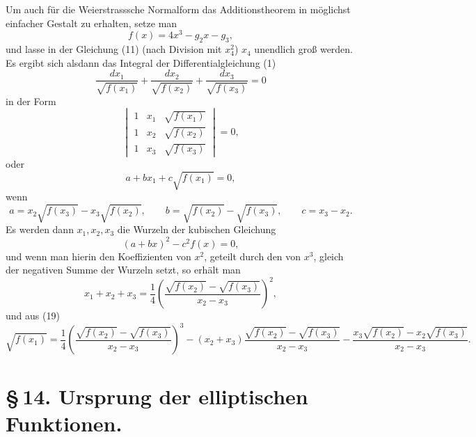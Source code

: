 \documentclass[11pt]{article}
\begin{document}
Um auch für die Weierstrasssche Normalform das Additionstheorem in möglichst einfacher Gestalt zu erhalten, setze man
\[
f(x)=4x^3-g_2x-g_3,
\]
und lasse in der Gleichung (11) (nach Division mit $x_4^2$) $x_4$ unendlich groß werden. Es ergibt sich alsdann das Integral der Differentialgleichung (1)
\[
\frac{dx_1}{\sqrt{f(x_1)}}+
\frac{dx_2}{\sqrt{f(x_2)}}+
\frac{dx_3}{\sqrt{f(x_3)}}=0
\]
in der Form
\begin{equation}
\begin{vmatrix}
1&x_1&\sqrt{f(x_1)}\\
1&x_2&\sqrt{f(x_2)}\\
1&x_3&\sqrt{f(x_3)}
\end{vmatrix}=0,
\tag{18}
\end{equation}
oder
\begin{equation}
a+bx_1+c\sqrt{f(x_1)}=0,
\tag{19}
\end{equation}
wenn
\begin{equation}
a=x_2\sqrt{f(x_3)}-x_3\sqrt{f(x_2)},\qquad
b=\sqrt{f(x_2)}-\sqrt{f(x_3)},\qquad
c=x_3-x_2.
\tag{20}
\end{equation}
Es werden dann $x_1,x_2,x_3$ die Wurzeln der kubischen Gleichung
\[
(a+bx)^2-c^2f(x)=0,
\]
und wenn man hierin den Koeffizienten von $x^2$, geteilt durch den von $x^3$, gleich der negativen Summe der Wurzeln setzt, so erhält man
\begin{equation}
x_1+x_2+x_3=\frac14\left(\frac{\sqrt{f(x_2)}-\sqrt{f(x_3)}}{x_2-x_3}\right)^2,
\tag{21}
\end{equation}
und aus (19)
\begin{equation}
\sqrt{f(x_1)}
=
\frac14\left(\frac{\sqrt{f(x_2)}-\sqrt{f(x_3)}}{x_2-x_3}\right)^3
-(x_2+x_3)\frac{\sqrt{f(x_2)}-\sqrt{f(x_3)}}{x_2-x_3}
-\frac{x_3\sqrt{f(x_2)}-x_2\sqrt{f(x_3)}}{x_2-x_3}.
\tag{22}
\end{equation}

\section*{\S\,14. Ursprung der elliptischen Funktionen.}
\end{document}
